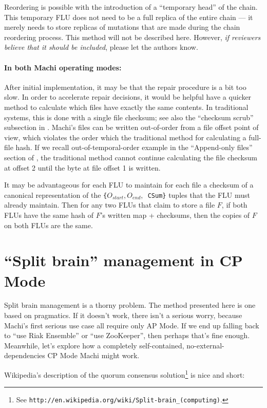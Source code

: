 \documentclass[preprint,10pt]{sigplanconf}
\begin{document}
Reordering is possible with the introduction of a ``temporary head''
of the chain.  This temporary FLU does not need to be a full replica
of the entire chain --- it merely needs to store replicas of mutations
that are made during the chain reordering process.  This method will
not be described here.  However, {\em if reviewers believe that it should
be included}, please let the authors know.

\paragraph{In both Machi operating modes:}
After initial implementation, it may be that the repair procedure is a
bit too slow.  In order to accelerate repair decisions, it would be
helpful have a quicker method to calculate which files have exactly
the same contents.  In traditional systems, this is done with a single
file checksum; see also the ``checksum scrub'' subsection in
\cite{machi-design}.
Machi's files can be written out-of-order from a file offset point of
view, which violates the order which the traditional method for
calculating a full-file hash.  If we recall out-of-temporal-order
example in the ``Append-only files'' section of \cite{machi-design},
the traditional method cannot
continue calculating the file checksum at offset 2 until the byte at
file offset 1 is written.

It may be advantageous for each FLU to maintain for each file a
checksum of a canonical representation of the
{\tt \{$O_{start},O_{end},$ CSum\}} tuples that the FLU must already
maintain.  Then for any two FLUs that claim to store a file $F$, if
both FLUs have the same hash of $F$'s written map + checksums, then
the copies of $F$ on both FLUs are the same.

\section{``Split brain'' management in CP Mode}
\label{sec:split-brain-management}

Split brain management is a thorny problem.  The method presented here
is one based on pragmatics.  If it doesn't work, there isn't a serious
worry, because Machi's first serious use case all require only AP Mode.
If we end up falling back to ``use Riak Ensemble'' or ``use ZooKeeper'',
then perhaps that's
fine enough.  Meanwhile, let's explore how a
completely self-contained, no-external-dependencies
CP Mode Machi might work.

Wikipedia's description of the quorum consensus solution\footnote{See
  {\tt http://en.wikipedia.org/wiki/Split-brain\_(computing)}.} is nice
and short:
\end{document}
